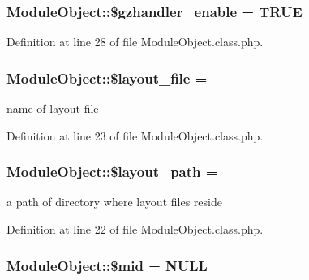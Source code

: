 \subsubsection[{\$gzhandler\+\_\+enable}]{\setlength{\rightskip}{0pt plus 5cm}Module\+Object\+::\$gzhandler\+\_\+enable = T\+R\+U\+E}\label{classModuleObject_acda88247a161a0ddf878e8f504909329}


Definition at line 28 of file Module\+Object.\+class.\+php.

\hypertarget{classModuleObject_a2a1677b06eb7b3ff04ff19e960a64e08}{}
\subsubsection[{\$layout\+\_\+file}]{\setlength{\rightskip}{0pt plus 5cm}Module\+Object\+::\$layout\+\_\+file = \textquotesingle{}\textquotesingle{}}\label{classModuleObject_a2a1677b06eb7b3ff04ff19e960a64e08}


name of layout file 



Definition at line 23 of file Module\+Object.\+class.\+php.

\hypertarget{classModuleObject_ada660958e777413d332337fba67d657f}{}
\subsubsection[{\$layout\+\_\+path}]{\setlength{\rightskip}{0pt plus 5cm}Module\+Object\+::\$layout\+\_\+path = \textquotesingle{}\textquotesingle{}}\label{classModuleObject_ada660958e777413d332337fba67d657f}


a path of directory where layout files reside 



Definition at line 22 of file Module\+Object.\+class.\+php.

\hypertarget{classModuleObject_abb68807f12d0fde6c9ea78a1a820d250}{}
\subsubsection[{\$mid}]{\setlength{\rightskip}{0pt plus 5cm}Module\+Object\+::\$mid = N\+U\+L\+L}\label{classModuleObject_abb68807f12d0fde6c9ea78a1a820d250}


